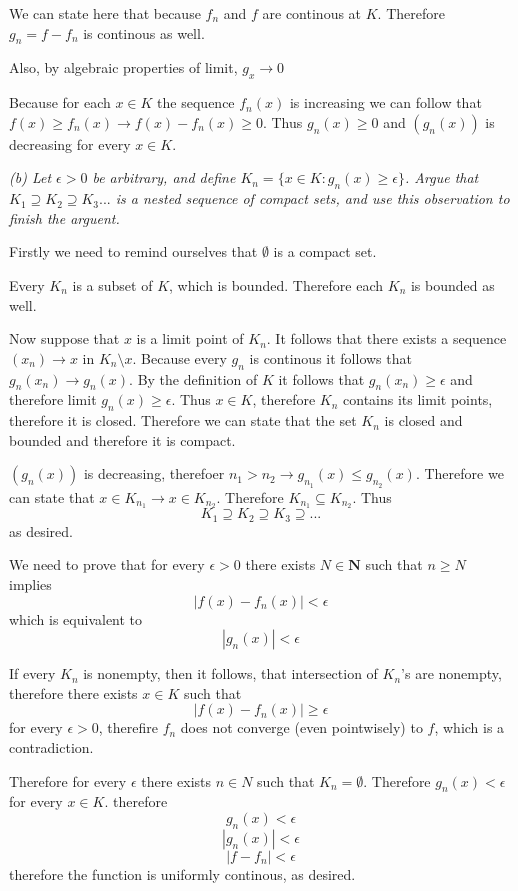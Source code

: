 \documentclass[11pt,oneside,titlepage]{book}
\begin{document}
We can state here that because $f_n$ and $f$ are continous at $K$.
Therefore $g_n = f - f_n$ is continous as well.

Also, by algebraic properties of limit, $g_x \to 0$ 

Because for each $x \in K$ the sequence $f_n(x)$ is increasing we
can follow that $f(x) \geq f_n(x) \to f(x) - f_n(x) \geq 0$. Thus
$g_n(x) \geq 0$ and $(g_n(x))$ is decreasing for every $x \in K$.

\textit{(b) Let $\epsilon > 0$ be arbitrary, and define
  $K_n = \{x \in K: g_n(x) \geq \epsilon\}$. Argue that $K_1 \supseteq K_2
  \supseteq K_3 ...$ is a nested sequence of compact sets, and use this
  observation to finish the arguent.}

Firstly we need to remind ourselves that $\emptyset$ is a compact set.

Every $K_n$ is a subset of $K$, which is bounded. Therefore
each $K_n$ is bounded as well.

Now suppose that $x$ is a limit point of $K_n$. It follows that there
exists a sequence $(x_n) \to x$ in $K_n \setminus x$.
Because every  $g_n$ is continous it follows that $g_n(x_n) \to g_n(x)$.
By the definition of $K$ it follows that  $g_n(x_n) \geq \epsilon$ and
therefore limit $g_n(x) \geq \epsilon$. Thus $x \in K$, therefore
$K_n$ contains its limit points, therefore it is closed.
Therefore we can state that the set $K_n$ is closed and bounded and therefore
it is compact.

$(g_n(x))$ is decreasing, therefoer $n_1 > n_2 \to g_{n_1}(x) \leq g_{n_2}(x)$.
Therefore we can state that $x \in K_{n_1} \to x \in K_{n_2}$. Therefore
$K_{n_1} \subseteq K_{n_2}$. Thus
$$K_1 \supseteq K_2  \supseteq K_3 \supseteq ... $$
as desired.


We need to prove that for every $\epsilon > 0$ there exists $N \in \textbf{N}$
such that $n \geq N$ implies
$$|f(x) - f_n(x)| < \epsilon$$
which is equivalent to 
$$|g_n(x)| < \epsilon$$

If every $K_n$ is nonempty, then it follows, that intersection of
$K_n$'s are nonempty, therefore there exists $x \in K$ such that
$$|f(x) - f_n(x)| \geq \epsilon$$
for every $\epsilon > 0$, therefire $f_n$ does not converge (even pointwisely)
to $f$, which is a contradiction.

Therefore for every $\epsilon$ there exists $n \in N$ such that
$K_n = \emptyset$. Therefore $g_n(x) < \epsilon$ for every $x \in K$.
therefore
$$g_n(x) < \epsilon$$
$$|g_n(x)| < \epsilon$$
$$|f - f_n| < \epsilon$$
therefore the function is uniformly continous, as desired.
\end{document}
